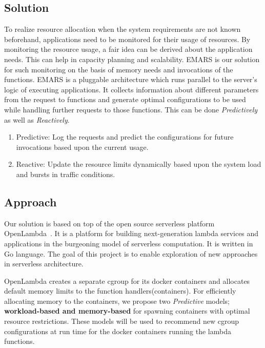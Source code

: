 \documentclass[letterpaper,twocolumn,10pt]{article}
\begin{document}
\subsection{Solution}
To realize resource allocation when the system requirements are not known beforehand, applications need to be monitored for their usage of resources. By monitoring the resource usage, a fair idea can be derived about the application needs. This can help in capacity planning and scalability. EMARS is our solution for such monitoring on the basis of memory needs and invocations of the functions. EMARS is a pluggable architecture which runs parallel to the server's logic of executing applications. It collects information about different parameters from the request to functions and generate optimal configurations to be used while handling further requests to those functions. This can be done {\it Predictively} as well as {\it Reactively}.
\begin{enumerate}
\item Predictive: Log the requests and predict the configurations for future invocations based upon the current usage.
\item Reactive: Update the resource limits dynamically based upon the system load and bursts in traffic conditions.

\end{enumerate}
\subsection{Approach}
Our solution is based on top of the open source serverless platform OpenLambda~\cite{openlambda.wp}. It is a platform for building next-generation lambda services and applications in the burgeoning model of serverless computation. It is written in Go language. The goal of this project is to enable exploration of new approaches  in serverless architecture.

OpenLambda creates a separate cgroup for its docker containers and allocates default memory limits to the function handlers(containers). For efficiently allocating memory to the containers, we propose two {\it Predictive} models; {\bf workload-based and memory-based} for spawning containers with optimal resource restrictions. These models will be used to recommend new cgroup configurations at run time for the docker containers running the lambda functions.
\end{document}

